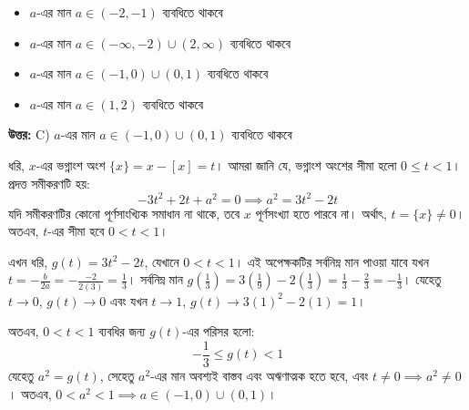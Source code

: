 \documentclass[12pt, a4paper]{article}
\begin{document}
\begin{itemize}[label={}, leftmargin=1cm, itemsep=0.5em]
    \item[\textbf{A)}] $a$-এর মান $a \in (-2, -1)$ ব্যবধিতে থাকবে
    \item[\textbf{B)}] $a$-এর মান $a \in (-\infty, -2) \cup (2, \infty)$ ব্যবধিতে থাকবে
    \item[\textbf{C)}] $a$-এর মান $a \in (-1, 0) \cup (0, 1)$ ব্যবধিতে থাকবে
    \item[\textbf{D)}] $a$-এর মান $a \in (1, 2)$ ব্যবধিতে থাকবে
\end{itemize}

\vspace{0.5em}
\begin{tcolorbox}[answerbox]
    \textbf{\color{success} উত্তর:} C) $a$-এর মান $a \in (-1, 0) \cup (0, 1)$ ব্যবধিতে থাকবে
\end{tcolorbox}
\vspace{1em}

\begin{tcolorbox}[solutionbox={সমাধান (Solution)}]
    \noindent
    ধরি, $x$-এর ভগ্নাংশ অংশ $\{x\} = x - [x] = t$। আমরা জানি যে, ভগ্নাংশ অংশের সীমা হলো $0 \le t < 1$। প্রদত্ত সমীকরণটি হয়:
    \[ -3t^2 + 2t + a^2 = 0 \implies a^2 = 3t^2 - 2t \]
    যদি সমীকরণটির কোনো পূর্ণসাংখ্যিক সমাধান না থাকে, তবে $x$ পূর্ণসংখ্যা হতে পারবে না। অর্থাৎ, $t = \{x\} \ne 0$। অতএব, $t$-এর সীমা হবে $0 < t < 1$।
    
    \vspace{0.5em}
    এখন ধরি, $g(t) = 3t^2 - 2t$, যেখানে $0 < t < 1$। এই অপেক্ষকটির সর্বনিম্ন মান পাওয়া যাবে যখন $t = -\frac{b}{2a} = -\frac{-2}{2(3)} = \frac{1}{3}$। 
    সর্বনিম্ন মান $g\left(\frac{1}{3}\right) = 3\left(\frac{1}{9}\right) - 2\left(\frac{1}{3}\right) = \frac{1}{3} - \frac{2}{3} = -\frac{1}{3}$।
    যেহেতু $t \to 0$, $g(t) \to 0$ এবং যখন $t \to 1$, $g(t) \to 3(1)^2 - 2(1) = 1$।
    
    \vspace{0.5em}
    অতএব, $0 < t < 1$ ব্যবধির জন্য $g(t)$-এর পরিসর হলো:
    \[ -\frac{1}{3} \le g(t) < 1 \]
    যেহেতু $a^2 = g(t)$, সেহেতু $a^2$-এর মান অবশ্যই বাস্তব এবং অঋণাত্মক হতে হবে, এবং $t \ne 0 \implies a^2 \ne 0$। 
    অতএব, $0 < a^2 < 1 \implies a \in (-1, 0) \cup (0, 1)$।
\end{tcolorbox}
\vspace{1em}
\end{document}
